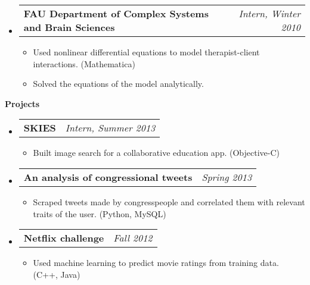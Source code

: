 \documentclass[letterpaper,10pt]{article}
\makeatletter
\newcommand{\resitem}[1]{\item #1 \vspace{-2pt}}
\newcommand{\resheading}[1]{{\large \colorbox{mygrey}{\begin{minipage}{\textwidth}{\textbf{#1 \vphantom{p\^{E}}}}\end{minipage}}}}
\newcommand{\ressubheading}[4]{
\begin{tabular*}{7.0in}{l@{\extracolsep{\fill}}r}
		\textbf{#1} & \textit{#4} \\
\end{tabular*}\vspace{-6pt}}
\makeatother
\begin{document}
\begin{itemize}
\item
	\ressubheading{FAU Department of Complex Systems and Brain Sciences}{Boca Raton, FL}{Research Intern}{Intern, Winter 2010}
	\begin{itemize}
		\resitem{Used nonlinear differential equations to model therapist-client interactions.  (Mathematica)}
		\resitem{Solved the equations of the model analytically.}
	\end{itemize}


\end{itemize}

\resheading{Projects}
\begin{itemize}
\item
	\ressubheading{SKIES}{Pasadena, CA}{Intern}{Intern, Summer 2013}
	\begin{itemize}
		\resitem{Built image search for a collaborative education app.  (Objective-C)}
	\end{itemize}

\item
	\ressubheading{An analysis of congressional tweets}{Pasadena, CA}{Student}{Spring 2013}
	\begin{itemize}
		\resitem{Scraped tweets made by congresspeople and correlated them with relevant traits of the user.  (Python, MySQL)}
	\end{itemize}
\item
	\ressubheading{Netflix challenge}{Pasadena, CA}{Student}{Fall 2012}
	\begin{itemize}
		\resitem{Used machine learning to predict movie ratings from training data.  (C++, Java)}
	\end{itemize}
\end{itemize}
\end{document}
